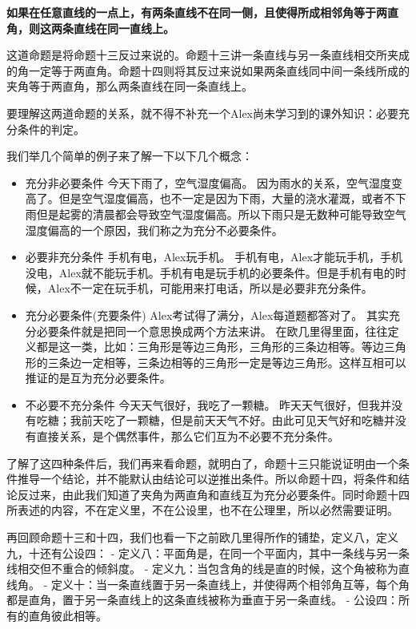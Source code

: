 \documentclass[
]{book}
\providecommand{\tightlist}{%
  \setlength{\itemsep}{0pt}\setlength{\parskip}{0pt}}
\begin{document}
\textbf{如果在任意直线的一点上，有两条直线不在同一侧，且使得所成相邻角等于两直角，则这两条直线在同一直线上。}

这道命题是将命题十三反过来说的。命题十三讲一条直线与另一条直线相交所夹成的角一定等于两直角。命题十四则将其反过来说如果两条直线同中间一条线所成的夹角等于两直角，那么两条直线在同一条直线上。

要理解这两道命题的关系，就不得不补充一个Alex尚未学习到的课外知识：必要充分条件的判定。

我们举几个简单的例子来了解一下以下几个概念：

\begin{itemize}
\tightlist
\item
  充分非必要条件
  今天下雨了，空气湿度偏高。
  因为雨水的关系，空气湿度变高了。但是空气湿度偏高，也不一定是因为下雨，大量的浇水灌溉，或者不下雨但是起雾的清晨都会导致空气湿度偏高。所以下雨只是无数种可能导致空气湿度偏高的一个原因，我们称之为充分不必要条件。
\item
  必要非充分条件
  手机有电，Alex玩手机。
  手机有电，Alex才能玩手机，手机没电，Alex就不能玩手机。手机有电是玩手机的必要条件。但是手机有电的时候，Alex不一定在玩手机，可能用来打电话，所以是必要非充分条件。
\item
  充分必要条件(充要条件)
  Alex考试得了满分，Alex每道题都答对了。
  其实充分必要条件就是把同一个意思换成两个方法来讲。
  在欧几里得里面，往往定义都是这一类，比如：三角形是等边三角形，三角形的三条边相等。等边三角形的三条边一定相等，三条边相等的三角形一定是等边三角形。这样互相可以推证的是互为充分必要条件。
\item
  不必要不充分条件
  今天天气很好，我吃了一颗糖。
  昨天天气很好，但我并没有吃糖；我前天吃了一颗糖，但是前天天气不好。由此可见天气好和吃糖并没有直接关系，是个偶然事件，那么它们互为不必要不充分条件。
\end{itemize}

了解了这四种条件后，我们再来看命题，就明白了，命题十三只能说证明由一个条件推导一个结论，并不能默认由结论可以逆推出条件。所以命题十四，将条件和结论反过来，由此我们知道了夹角为两直角和直线互为充分必要条件。同时命题十四所表述的内容，不在定义里，不在公设里，也不在公理里，所以必然需要证明。

再回顾命题十三和十四，我们也看一下之前欧几里得所作的铺垫，定义八，定义九，十还有公设四：
- 定义八：平面角是，在同一个平面内，其中一条线与另一条线相交但不重合的倾斜度。
- 定义九：当包含角的线是直的时候，这个角被称为直线角。
- 定义十：当一条直线置于另一条直线上，并使得两个相邻角互等，每个角都是直角，置于另一条直线上的这条直线被称为垂直于另一条直线。
- 公设四：所有的直角彼此相等。
\end{document}
